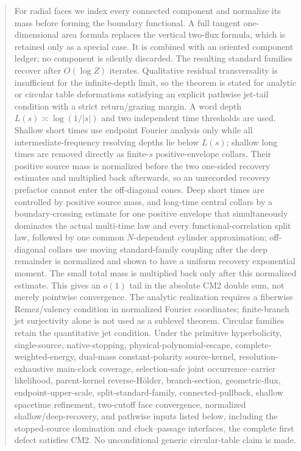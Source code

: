 \documentclass[11pt]{article}
\begin{document}
\begin{abstract}
For radial faces we index every connected component and normalize its mass
before forming the boundary functional.  A full tangent one-dimensional area
formula replaces the vertical two-flux formula, which is retained only as a
special case.  It is combined with an oriented component ledger; no component is silently
discarded.  The resulting standard families recover after $O(\log Z)$
iterates.  Qualitative residual transversality is insufficient for the
infinite-depth limit, so the theorem is stated for analytic or circular table
deformations satisfying an explicit pathwise jet-tail condition with a
strict return/grazing margin.  A word depth $L(s)\asymp\log(1/|s|)$ and two
independent time thresholds are used.  Shallow short times use endpoint
Fourier analysis only while all intermediate-frequency resolving depths lie
below $L(s)$; shallow long times are removed directly as finite-$s$
positive-envelope collars.  Their positive source mass is normalized before
the two one-sided recovery estimates and multiplied back afterwards, so an
unrecorded recovery prefactor cannot enter the off-diagonal cones.
Deep short times are controlled by positive source mass, and long-time
central collars by a boundary-crossing estimate for
one positive envelope that simultaneously dominates the actual multi-time law
and every functional-correlation split law, followed by one common
$N$-dependent cylinder approximation;
off-diagonal collars use moving standard-family coupling after the deep
remainder is normalized and shown to have a uniform recovery exponential
moment.  The small total mass is multiplied back only after this normalized
estimate.  This gives an
$o(1)$ tail in the absolute CM2 double sum, not merely pointwise convergence.
The analytic realization requires a fiberwise Remez/valency condition in
normalized Fourier coordinates; finite-branch jet surjectivity alone is not
used as a sublevel theorem.  Circular families retain the quantitative jet
condition.  Under the primitive hyperbolicity, single-source,
native-stopping, physical-polynomial-escape, complete-weighted-energy,
dual-mass constant-polarity source-kernel, resolution-exhaustive main-clock
coverage, selection-safe joint occurrence--carrier likelihood,
parent-kernel reverse-H\"older, branch-section,
geometric-flux, endpoint-upper-scale, split-standard-family,
connected-pullback, shallow spacetime refinement, two-cutoff face convergence,
normalized shallow/deep-recovery, and pathwise inputs
listed below, including the stopped-source domination and clock--passage
interfaces, the complete first
defect satisfies CM2.  No unconditional generic circular-table claim is made.

\end{abstract}
\end{document}
